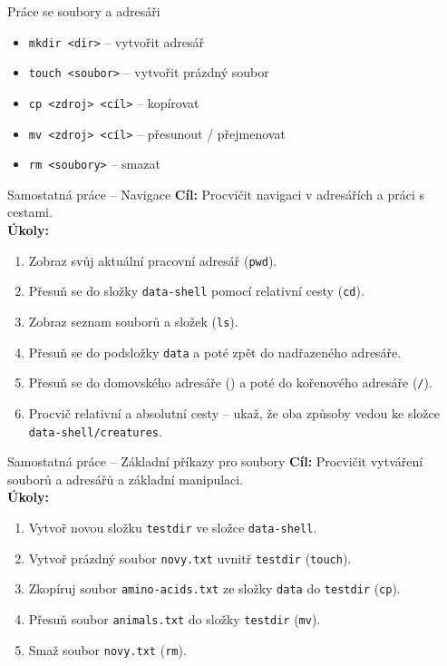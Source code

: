 \documentclass{beamer}
\newcommand{\ts}{\raisebox{-0.25em}{\textasciitilde}}
\begin{document}
  \begin{frame}{Práce se soubory a adresáři}
    \begin{itemize}
      \item \texttt{mkdir <dir>} – vytvořit adresář
      \item \texttt{touch <soubor>} – vytvořit prázdný soubor
      \item \texttt{cp <zdroj> <cíl>} – kopírovat
      \item \texttt{mv <zdroj> <cíl>} – přesunout / přejmenovat
      \item \texttt{rm <soubory>} – smazat
    \end{itemize}
  \end{frame}

\begin{frame}{Samostatná práce – Navigace}
\small
\textbf{Cíl:} Procvičit navigaci v adresářích a práci s cestami.\\[0.5em]

\textbf{Úkoly:}
\begin{enumerate}
  \item Zobraz svůj aktuální pracovní adresář (\texttt{pwd}).
  \item Přesuň se do složky \texttt{data-shell} pomocí relativní cesty (\texttt{cd}).
  \item Zobraz seznam souborů a složek (\texttt{ls}).
  \item Přesuň se do podsložky \texttt{data} a poté zpět do nadřazeného adresáře.
  \item Přesuň se do domovského adresáře (\texttt{\ts}) a poté do kořenového adresáře (\texttt{/}).
  \item Procvič relativní a absolutní cesty – ukaž, že oba způsoby vedou ke složce \texttt{data-shell/creatures}.
\end{enumerate}
\end{frame}

\begin{frame}{Samostatná práce – Základní příkazy pro soubory}
\small
\textbf{Cíl:} Procvičit vytváření souborů a adresářů a základní manipulaci.\\[0.5em]

\textbf{Úkoly:}
\begin{enumerate}
  \item Vytvoř novou složku \texttt{testdir} ve složce \texttt{data-shell}.
  \item Vytvoř prázdný soubor \texttt{novy.txt} uvnitř \texttt{testdir} (\texttt{touch}).
  \item Zkopíruj soubor \texttt{amino-acids.txt} ze složky \texttt{data} do \texttt{testdir} (\texttt{cp}).
  \item Přesuň soubor \texttt{animals.txt} do složky \texttt{testdir} (\texttt{mv}).
  \item Smaž soubor \texttt{novy.txt} (\texttt{rm}).
\end{enumerate}
\end{frame}
\end{document}
